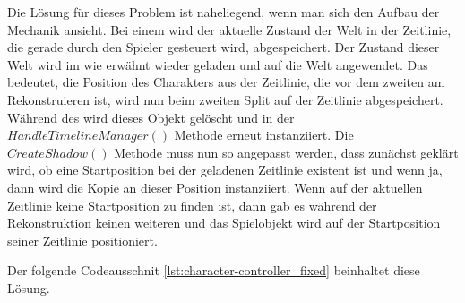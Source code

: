 Die Lösung für dieses Problem ist naheliegend, wenn man sich den Aufbau der Mechanik ansieht. Bei einem  wird der aktuelle Zustand der Welt in der Zeitlinie, die gerade durch den Spieler gesteuert wird, abgespeichert. Der Zustand dieser Welt wird im  wie erwähnt wieder geladen und auf die Welt angewendet. Das bedeutet, die Position des Charakters aus der Zeitlinie, die vor dem zweiten  am Rekonstruieren ist, wird nun beim zweiten Split auf der Zeitlinie abgespeichert. Während des  wird dieses Objekt gelöscht und in der $HandleTimelineManager()$ Methode erneut instanziiert. Die $CreateShadow()$ Methode muss nun so angepasst werden, dass zunächst geklärt wird, ob eine Startposition bei der geladenen Zeitlinie existent ist und wenn ja, dann wird die Kopie an dieser Position instanziiert. Wenn auf der aktuellen Zeitlinie keine Startposition zu finden ist, dann gab es während der Rekonstruktion keinen weiteren  und das Spielobjekt wird auf der Startposition seiner Zeitlinie positioniert. 

Der folgende Codeausschnit \ref{lst:character-controller_fixed} beinhaltet diese Lösung.

